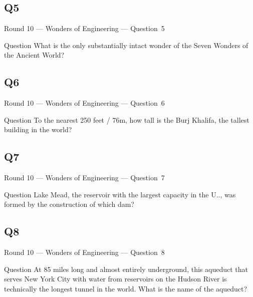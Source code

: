 \documentclass[11pt]{beamer}
\begin{document}
\subsection*{Q5}
\begin{frame}[t]{Round 10 --- Wonders of Engineering --- \mbox{Question 5}}
    \vspace{-0.5em}
    \begin{block}{Question}
        What is the only substantially intact wonder of the Seven Wonders of the Ancient World?
    \end{block}
\end{frame}
\subsection*{Q6}
\begin{frame}[t]{Round 10 --- Wonders of Engineering --- \mbox{Question 6}}
    \vspace{-0.5em}
    \begin{block}{Question}
        To the nearest 250 feet / 76m, how tall is the Burj Khalifa, the tallest building in the world?
    \end{block}
\end{frame}
\subsection*{Q7}
\begin{frame}[t]{Round 10 --- Wonders of Engineering --- \mbox{Question 7}}
    \vspace{-0.5em}
    \begin{block}{Question}
        Lake Mead, the reservoir with the largest capacity in the U.\@S.\@, was formed by the construction of which dam?
    \end{block}
\end{frame}
\subsection*{Q8}
\begin{frame}[t]{Round 10 --- Wonders of Engineering --- \mbox{Question 8}}
    \vspace{-0.5em}
    \begin{block}{Question}
        At 85 miles long and almost entirely underground, this aqueduct that serves New York City with water from reservoirs on the Hudson River is technically the longest tunnel in the world. What is the name of the aqueduct?
    \end{block}
\end{frame}
\end{document}
